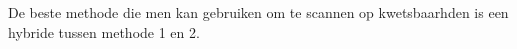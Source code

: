 De beste methode die men kan gebruiken om te scannen op kwetsbaarhden is een hybride tussen methode 1 en 2.



%
%
